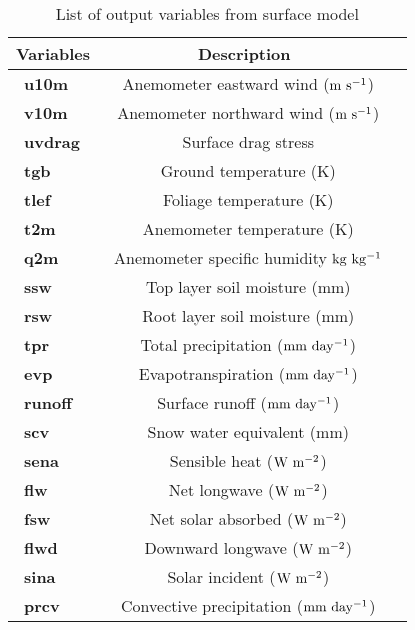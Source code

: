 \begin{table}[!]
\begin{center}
\caption{List of output variables from surface model}  \label{lsm_var}
\vspace{0.25cm}
\begin{tabular}{|l|c|l|} \hline \hline
{\small {\bf Variables}} & {\small {\bf Description}} \\ \hline \hline
{\ {\bf u10m}}    & {\ {Anemometer eastward wind (${\rm m~s^{-1}}$)} }      \\ \hline
{\ {\bf v10m}}    & {\ {Anemometer northward wind (${\rm m~s^{-1}}$)} }     \\ \hline
{\ {\bf uvdrag}}    & {\ {Surface drag stress}}       \\ \hline
{\ {\bf tgb}}    & {\ {Ground temperature (K)} }      \\ \hline
{\ {\bf tlef}}    & {\ {Foliage temperature (K)} }     \\ \hline
{\ {\bf t2m}}    & {\ {Anemometer temperature (K)}}       \\ \hline
{\ {\bf q2m}}    & {\ {Anemometer specific humidity ${\rm kg~kg^{-1}}$ } }      \\ \hline
{\ {\bf ssw}}    & {\ {Top layer soil moisture (mm)} }     \\ \hline
{\ {\bf rsw}}    & {\ {Root layer soil moisture (mm)}}       \\ \hline
{\ {\bf tpr}}    & {\ {Total precipitation (${\rm mm~day^{-1}}$)} }      \\ \hline
{\ {\bf evp}}    & {\ {Evapotranspiration (${\rm mm~day^{-1}}$)} }     \\ \hline
{\ {\bf runoff}}    & {\ {Surface runoff (${\rm mm~day^{-1}}$)}}       \\ \hline
{\ {\bf scv}}    & {\ {Snow water equivalent (mm)} }      \\ \hline
{\ {\bf sena}}    & {\ {Sensible heat (${\rm W~m^{-2}}$)} }     \\ \hline
{\ {\bf flw}}    & {\ {Net longwave (${\rm W~m^{-2}}$)}}       \\ \hline
{\ {\bf fsw}}    & {\ {Net solar absorbed (${\rm W~m^{-2}}$)} }      \\ \hline
{\ {\bf flwd}}   & {\ {Downward longwave (${\rm W~m^{-2}}$)} }     \\ \hline
{\ {\bf sina}}    & {\ {Solar incident (${\rm W~m^{-2}}$)}}       \\ \hline
{\ {\bf prcv}}    & {\ {Convective precipitation (${\rm mm~day^{-1}}$)} }      \\ \hline

\end{tabular}
\end{center}
\end{table}
